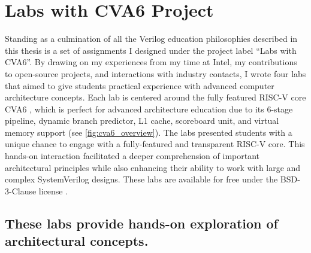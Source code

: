 
\chapter{Labs with CVA6 Project}
\label{chapter:labs_with_cva6}



Standing as a culmination of all the Verilog education philosophies described in this thesis is a set of assignments I designed under the project label \enquote{Labs with CVA6}.
By drawing on my experiences from my time at Intel, my contributions to open-source projects, and interactions with industry contacts, I wrote four labs that aimed to give students practical experience with advanced computer architecture concepts.
Each lab is centered around the fully featured RISC-V core CVA6 \cite{cva6}, which is perfect for advanced architecture education due to its 6-stage pipeline, dynamic branch predictor, L1 cache, scoreboard unit, and virtual memory support (see \autoref{fig:cva6_overview}).
The labs presented students with a unique chance to engage with a fully-featured and transparent RISC-V core.
This hands-on interaction facilitated a deeper comprehension of important architectural principles while also enhancing their ability to work with large and complex SystemVerilog designs.
These labs are available for free under the BSD-3-Clause license \cite{labsWithCVA6}.

\FloatBarrier

\section{These labs provide hands-on exploration of architectural concepts.}






